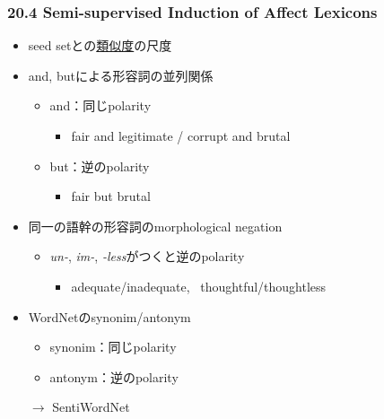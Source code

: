 \begin{frame}
    \frametitle{20.4 Semi-supervised Induction of Affect Lexicons}
    \begin{itemize}
        \item seed setとの\underline{類似度}の尺度
    \end{itemize}
    \begin{itemize}
        \item and, butによる形容詞の並列関係 
        \begin{itemize}
            \item and：同じpolarity
            \begin{itemize}
                \item fair and legitimate / corrupt and brutal
            \end{itemize}
            \item but：逆のpolarity
            \begin{itemize}
                \item fair but brutal
            \end{itemize}
        \end{itemize}
    \end{itemize}
    \begin{itemize}
        \item 同一の語幹の形容詞のmorphological negation
        \begin{itemize}
            \item \textit{un-}, \textit{im-}, \textit{-less}がつくと逆のpolarity
            \begin{itemize}
                \item adequate/inadequate, \ thoughtful/thoughtless
            \end{itemize}
        \end{itemize}
    \end{itemize}
    \begin{itemize}
        \item WordNetのsynonim/antonym
        \begin{itemize}
            \item synonim：同じpolarity
            \item antonym：逆のpolarity
        \end{itemize}
        \quad $\to$ SentiWordNet 
    \end{itemize}
\end{frame}
